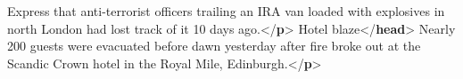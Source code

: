 \begin{shaded}
\hspace*{1em}\hspace*{1em}\hspace*{1em}\hspace*{1em} Express that anti-terrorist officers trailing an IRA van\mbox{}\newline 
\hspace*{1em}\hspace*{1em}\hspace*{1em}\hspace*{1em} loaded with explosives in north London had lost track of\mbox{}\newline 
\hspace*{1em}\hspace*{1em}\hspace*{1em}\hspace*{1em} it 10 days ago.{</\textbf{p}>}\mbox{}\newline 
{}\mbox{}\newline 
{}\mbox{}\newline 
\hspace*{1em}Hotel blaze{</\textbf{head}>}\mbox{}\newline 
\hspace*{1em}Nearly 200 guests were evacuated before dawn\mbox{}\newline 
\hspace*{1em}\hspace*{1em}\hspace*{1em}\hspace*{1em} yesterday after fire broke out at the Scandic\mbox{}\newline 
\hspace*{1em}\hspace*{1em}\hspace*{1em}\hspace*{1em} Crown hotel in the Royal Mile, Edinburgh.{</\textbf{p}>}\mbox{}\newline 
{}\mbox{}\newline 
{}\mbox{}\newline 

\end{shaded}
